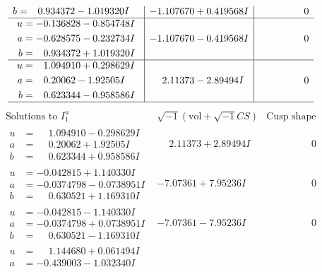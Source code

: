 \documentclass[1p]{elsarticle_modified}
\theoremstyle{definition}
\newcommand{\I}{\sqrt{-1}}
\begin{document}
$$\begin{array}{c|c|c}
\begin{aligned}
b &= \phantom{-}0.934372 - 1.019320 I\end{aligned}
 & -1.107670 + 0.419568 I & \phantom{-0.000000 } 0 \\ \hline\begin{aligned}
u &= -0.136828 - 0.854748 I \\
a &= -0.628575 - 0.232734 I \\
b &= \phantom{-}0.934372 + 1.019320 I\end{aligned}
 & -1.107670 - 0.419568 I & \phantom{-0.000000 } 0 \\ \hline\begin{aligned}
u &= \phantom{-}1.094910 + 0.298629 I \\
a &= \phantom{-}0.20062 - 1.92505 I \\
b &= \phantom{-}0.623344 - 0.958586 I\end{aligned}
 & \phantom{-}2.11373 - 2.89494 I & \phantom{-0.000000 } 0\\
 \hline 
 \end{array}$$\newpage$$\begin{array}{c|c|c}  
\text{Solutions to }I^u_{1}& \I (\text{vol} + \sqrt{-1}CS) & \text{Cusp shape}\\
 \hline 
\begin{aligned}
u &= \phantom{-}1.094910 - 0.298629 I \\
a &= \phantom{-}0.20062 + 1.92505 I \\
b &= \phantom{-}0.623344 + 0.958586 I\end{aligned}
 & \phantom{-}2.11373 + 2.89494 I & \phantom{-0.000000 } 0 \\ \hline\begin{aligned}
u &= -0.042815 + 1.140330 I \\
a &= -0.0374798 - 0.0738951 I \\
b &= \phantom{-}0.630521 + 1.169310 I\end{aligned}
 & -7.07361 + 7.95236 I & \phantom{-0.000000 } 0 \\ \hline\begin{aligned}
u &= -0.042815 - 1.140330 I \\
a &= -0.0374798 + 0.0738951 I \\
b &= \phantom{-}0.630521 - 1.169310 I\end{aligned}
 & -7.07361 - 7.95236 I & \phantom{-0.000000 } 0 \\ \hline\begin{aligned}
u &= \phantom{-}1.144680 + 0.061494 I \\
a &= -0.439003 - 1.032340 I \\

\end{aligned}
\end{array}$$
\end{document}
